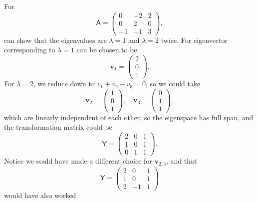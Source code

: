 \documentclass[letter-paper]{tufte-book}
\newenvironment{example}[1][Example]{\begin{trivlist}
\item[\hskip \labelsep {\bfseries #1}]}{\end{trivlist}}
\begin{document}
\begin{example}
  For
  \begin{equation*}
    \mathsf{A} = \begin{pmatrix}0 & -2 & 2 \\ 0 & 2 & 0 \\ -1 & -1 & 3\end{pmatrix},
  \end{equation*}
  can show that the eigenvalues are $\lambda=1$ and $\lambda=2$ twice. For
  eigenvector corresponding to $\lambda=1$ can be chosen to be
  \begin{equation*}
    \boldsymbol{v}_1 = \begin{pmatrix}2 \\ 0 \\ 1\end{pmatrix}.
  \end{equation*}
  For $\lambda=2$, we reduce down to $v_1 + v_2 - v_3 = 0$, so we could take
  \begin{equation*}
    \boldsymbol{v}_2 = \begin{pmatrix}1 \\ 0 \\ 1\end{pmatrix}, \quad \boldsymbol{v}_3 = \begin{pmatrix}0 \\ 1 \\ 1\end{pmatrix},
  \end{equation*}
  which are linearly independent of each other, so the eigenspace has full span,
  and the transformation matrix could be
  \begin{equation*}
    \mathsf{Y} = \begin{pmatrix}2 & 0 & 1 \\ 1 & 0 & 1 \\ 0 & 1 & 1\end{pmatrix}.
  \end{equation*}
  Notice we could have made a different choice for $\boldsymbol{v}_{2,3}$, and
  that
  \begin{equation*}
    \mathsf{Y} = \begin{pmatrix}2 & 0 & 1 \\ 1 & 0 & 1 \\ 2 & -1 & 1\end{pmatrix}
  \end{equation*}
  would have also worked.
\end{example}
\end{document}
